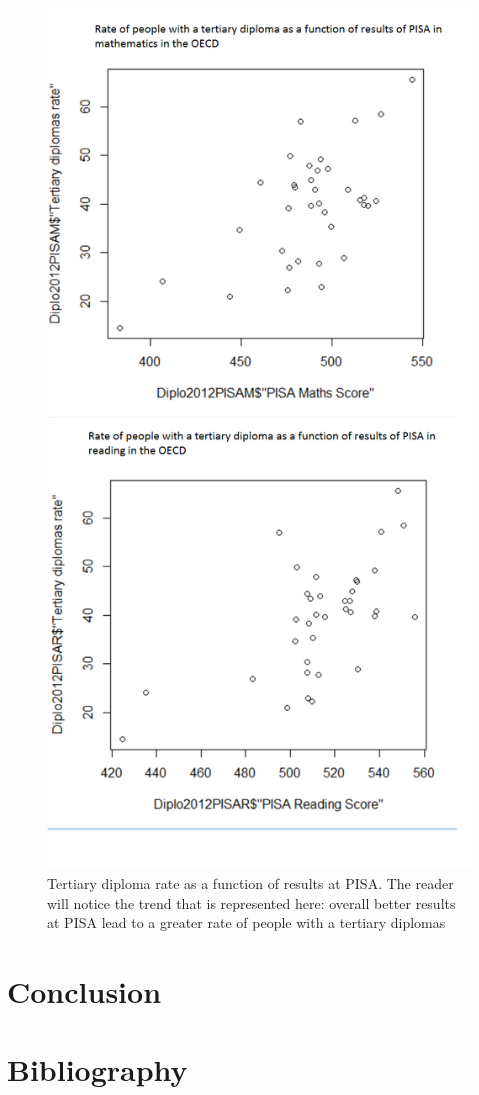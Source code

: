 \documentclass[12pt,a4paper]{article}
\begin{document}
\begin{figure}
	\centering
	\label{3DRate}
	\caption{Tertiary diploma rate as a function of results at PISA. The reader will notice the trend that is represented here: overall better results at PISA lead to a greater rate of people with a tertiary diplomas}
	\includegraphics[scale=0.4]{img/3DRate.png}
\end{figure}

\section{Conclusion}

\section{Bibliography}
\end{document}
